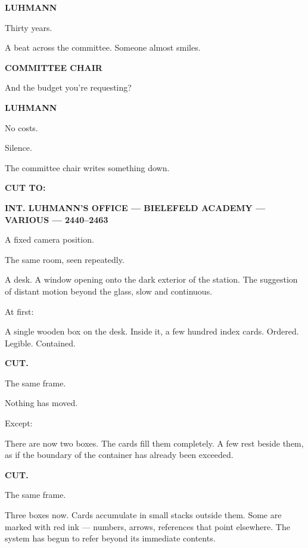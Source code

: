 \documentclass[12pt]{article}
\newcommand{\sceneheading}[1]{%
  \vspace{10pt}%
  \noindent\textbf{#1}%
  \vspace{6pt}%
}
\newcommand{\trans}[1]{%
  \vspace{8pt}%
  \begin{flushright}\textbf{#1}\end{flushright}%
  \vspace{4pt}%
}
\newcommand{\character}[1]{%
  \vspace{8pt}%
  \begin{center}\textbf{#1}\end{center}%
  \vspace{-4pt}%
}
\newenvironment{dialogue}{%
  \begin{center}%
  \begin{minipage}{0.62\textwidth}%
}{%
  \end{minipage}%
  \end{center}%
  \vspace{4pt}%
}
\newenvironment{action}{%
  \vspace{4pt}%
  \noindent\ignorespaces%
}{%
  \vspace{6pt}%
}
\begin{document}
\character{LUHMANN}
\begin{dialogue}
Thirty years.
\end{dialogue}

\begin{action}
A beat across the committee. Someone almost smiles.
\end{action}

\character{COMMITTEE CHAIR}
\begin{dialogue}
And the budget you're requesting?
\end{dialogue}

\character{LUHMANN}
\begin{dialogue}
No costs.
\end{dialogue}

\begin{action}
Silence.

The committee chair writes something down.
\end{action}

\trans{CUT TO:}

\sceneheading{INT. LUHMANN'S OFFICE — BIELEFELD ACADEMY — VARIOUS — 2440–2463}

\begin{action}
A fixed camera position.

The same room, seen repeatedly.

\medskip

A desk. A window opening onto the dark exterior of the station. The suggestion of distant motion beyond the glass, slow and continuous.

\medskip

At first:

A single wooden box on the desk. Inside it, a few hundred index cards. Ordered. Legible. Contained.
\end{action}

\textbf{CUT.}

\begin{action}
The same frame.

Nothing has moved.

Except:

There are now two boxes. The cards fill them completely. A few rest beside them, as if the boundary of the container has already been exceeded.
\end{action}

\textbf{CUT.}

\begin{action}
The same frame.

Three boxes now. Cards accumulate in small stacks outside them. Some are marked with red ink — numbers, arrows, references that point elsewhere. The system has begun to refer beyond its immediate contents.
\end{action}
\end{document}
